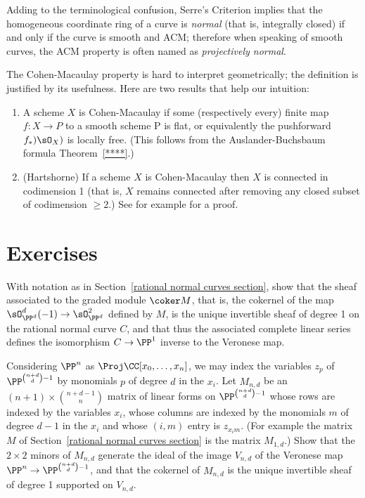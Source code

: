Adding to the terminological confusion, Serre's Criterion implies that the homogeneous coordinate ring
of a curve is \emph{normal} (that is, integrally closed) if and only if the curve is smooth and ACM; therefore
when speaking of smooth curves, the ACM property is often named as \emph{projectively normal}.

\begin{fact}\label{meaning of ACM}
The Cohen-Macaulay property is hard to interpret geometrically; the definition is justified by its usefulness. Here are two results that help our intuition:
\begin{enumerate}
\item A scheme $X$ is Cohen-Macaulay if some (respectively every) finite map $f: X\to P$ to a smooth scheme P is flat, or equivalently the pushforward $f_*)\sO_X)$ is locally free. (This follows
from the Auslander-Buchsbaum formula Theorem~\ref{****}.)
\item (Hartshorne) If a scheme $X$ is Cohen-Macaulay then $X$ is connected in codimension 1 (that is, $X$ remains connected after removing any closed subset of codimension $\geq 2$.)
See for example \cite[Theorem 18.12]{Eisenbud1995} for a proof.
\end{enumerate}
 
\end{fact}


\section{Exercises}

\begin{exercise}\label{veronese inverse}
With notation as in Section~\ref{rational normal curves section}, show that the sheaf associated to the graded module $\coker M$,
that is, the cokernel of the map $\sO_{\PP^d}^d(-1) \to \sO_{\PP^d}^2$ defined by $M$, is the unique invertible sheaf of degree 1
on the rational normal curve $C$, and that thus the associated complete linear series defines the isomorphism $C\to \PP^1$ inverse
to the Veronese map.
\end{exercise}

\begin{exercise}\label{equations of Veroneses}
Considering $\PP^n$ as $\Proj \CC[x_0,\dots,x_n]$, we may index the variables $z_p$ of $\PP^{\binom{n+d}{d}-1}$ by  monomials $p$
of degree $d$ in the $x_i$. Let $M_{n,d}$ be an $(n+1)\times \binom{n+d-1}{n}$ matrix of linear forms
on $\PP^{\binom{n+d}{d}-1}$ whose rows are indexed by the variables $x_i$, whose columns are indexed by the monomials $m$ of degree $d-1$ in the $x_i$ and
whose $(i,m)$ entry is $z_{x_im}$. (For example the matrix
$M$ of Section~\ref{rational normal curves section} is the matrix $M_{1,d}$.) Show that the $2\times 2$ minors of $M_{n,d}$ generate the ideal of the image $V_{n,d}$ of the Veronese map 
$\PP^n\to \PP^{\binom{n+d}{d}-1}$, and that the cokernel of $M_{n,d}$ is the unique invertible sheaf of degree 1 supported on $V_{n,d}$.
\end{exercise}

